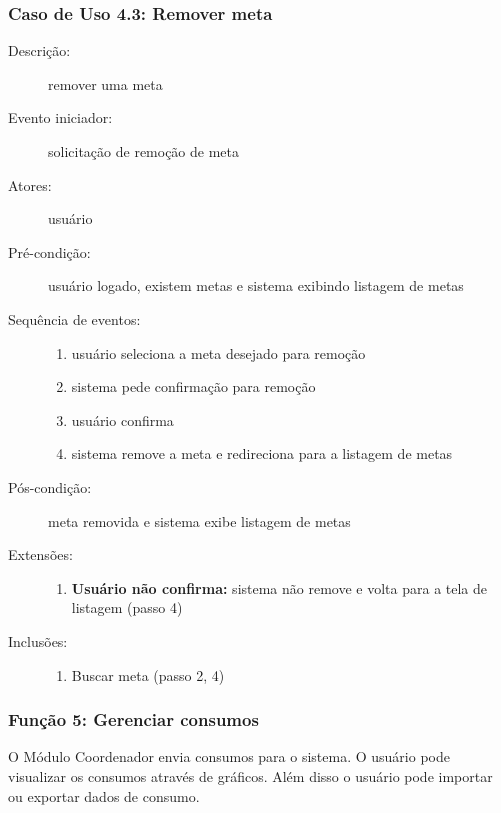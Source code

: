 \subsubsection{Caso de Uso 4.3: Remover meta}
\begin{description}
	\item[Descrição:] remover uma meta
	\item[Evento iniciador:] solicitação de remoção de meta
	\item[Atores:] usuário
	\item[Pré-condição:] usuário logado, existem metas e sistema exibindo listagem de metas
	\item[Sequência de eventos:] \hfill
		\begin{enumerate}
			\item{usuário seleciona a meta desejado para remoção}
			\item{sistema pede confirmação para remoção}
			\item{usuário confirma}
			\item{sistema remove a meta e redireciona para a listagem de metas}
		\end{enumerate}
	\item[Pós-condição:] meta removida e sistema exibe listagem de metas
	\item[Extensões:] \hfill
		\begin{enumerate}
			\item{\textbf{Usuário não confirma:} sistema não remove e volta para a tela de listagem (passo 4)}
		\end{enumerate}
	\item[Inclusões:] \hfill
		\begin{enumerate}
			\item{Buscar meta (passo 2, 4)}
		\end{enumerate}
\end{description}
\subsubsection{Função 5: Gerenciar consumos}
O Módulo Coordenador envia consumos para o sistema. O usuário pode visualizar os consumos através de gráficos. Além disso o usuário pode importar ou exportar dados de consumo.
%
